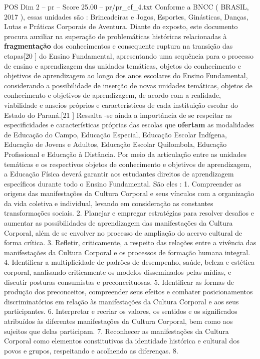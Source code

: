 \begin{textsample}{POS Dim 2 – pr – Score 25.00 – pr/pr\_ef\_4.txt}
Conforme a BNCC ( BRASIL, 2017 ), essas unidades são : Brincadeiras e Jogos, Esportes, Ginásticas, Danças, Lutas e Práticas Corporais de Aventura.
Diante do exposto, este documento procura auxiliar na superação de problemáticas históricas relacionadas à \textbf{fragmentação} dos conhecimentos e consequente ruptura na transição das etapas[20 ] do Ensino Fundamental, apresentando uma sequência para o processo de ensino e aprendizagem das unidades temáticas, objetos do conhecimento e objetivos de aprendizagem ao longo dos anos escolares do Ensino Fundamental, considerando a possibilidade de inserção de novas unidades temáticas, objetos de conhecimento e objetivos de aprendizagem, de acordo com a realidade, viabilidade e anseios próprios e característicos de cada instituição escolar do Estado do Paraná.[21 ] Ressalta -se ainda a importância de se respeitar as especificidades e características próprias das escolas que \textbf{ofertam} as modalidades de Educação do Campo, Educação Especial, Educação Escolar Indígena, Educação de Jovens e Adultos, Educação Escolar Quilombola, Educação Profissional e Educação à Distância.
Por meio da articulação entre as unidades temáticas e os respectivos objetos de conhecimento e objetivos de aprendizagem, a Educação Física deverá garantir aos estudantes direitos de aprendizagem específicos durante todo o Ensino Fundamental.
São eles : 1.
Compreender as origens das manifestações da Cultura Corporal e seus vínculos com a organização da vida coletiva e individual, levando em consideração as constantes transformações sociais. 2.
Planejar e empregar estratégias para resolver desafios e aumentar as possibilidades de aprendizagem das manifestações da Cultura Corporal, além de se envolver no processo de ampliação do acervo cultural de forma crítica. 3.
Refletir, criticamente, a respeito das relações entre a vivência das manifestações da Cultura Corporal e os processos de formação humana integral. 4.
Identificar a multiplicidade de padrões de desempenho, saúde, beleza e estética corporal, analisando criticamente os modelos disseminados pelas mídias, e discutir posturas consumistas e preconceituosas. 5.
Identificar as formas de produção dos preconceitos, compreender seus efeitos e combater posicionamentos discriminatórios em relação às manifestações da Cultura Corporal e aos seus participantes. 6.
Interpretar e recriar os valores, os sentidos e os significados atribuídos às diferentes manifestações da Cultura Corporal, bem como aos sujeitos que delas participam. 7.
Reconhecer as manifestações da Cultura Corporal como elementos constitutivos da identidade histórica e cultural dos povos e grupos, respeitando e acolhendo as diferenças. 8.

\end{textsample}
